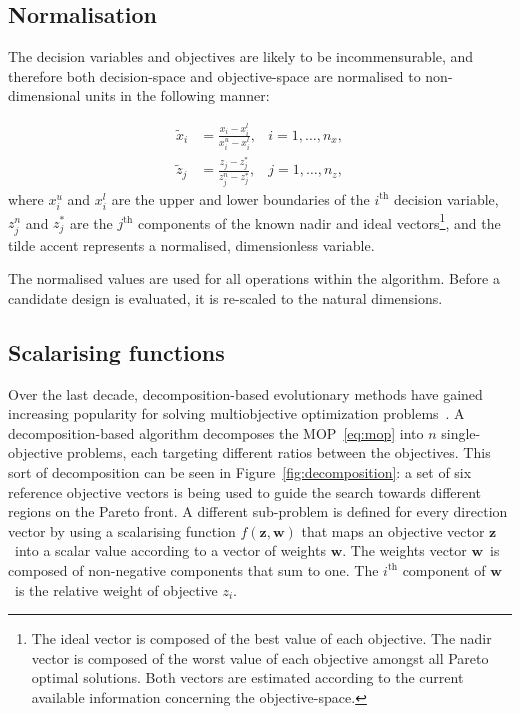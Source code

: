 \documentclass[a4paper]{article}
\newcommand{\brr}[1]{{\left({#1}\right)}} %
\newcommand{\vz}{\ensuremath{\mathbf{z}}} %
\newcommand{\vw}{\ensuremath{\mathbf{w}}} %
\begin{document}
\subsection{Normalisation} 
\label{subsec:Normalisation}
The decision variables and objectives are likely to be incommensurable, and therefore both decision-space and objective-space are normalised to non-dimensional units in the following manner:

\begin{align}
	\tilde{x}_i &= \frac{x_i - x^l_i}{x^u_i - x^l_i} , &i=1,\ldots,n_x,\\
	\tilde{z}_j &= \frac{z_j - z^*_j}{z^n_j - z^*_j} , &j=1,\ldots,n_z,
\end{align}
where $x^u_i$ and $x^l_i$ are the upper and lower boundaries of the $i^\text{th}$ decision variable, $z^n_j$ and $z^*_j$ are the $j^\text{th}$ components of the known nadir and ideal vectors\footnote{The ideal vector is composed of the best value of each objective. The nadir vector is composed of the worst value of each objective amongst all Pareto optimal solutions. Both vectors are estimated according to the current available information concerning the objective-space.}, and the tilde accent represents a normalised, dimensionless variable.

The normalised values are used for all operations within the algorithm. Before a candidate design is evaluated, it is re-scaled to the natural dimensions.

\subsection{Scalarising functions}
\label{subsec:Scalarising}
Over the last decade, decomposition-based evolutionary methods have gained increasing popularity for solving multiobjective optimization problems~\cite{Giagkiozis2013Overview}. A decomposition-based algorithm decomposes the MOP~\eqref{eq:mop} into $n$ single-objective problems, each targeting different ratios between the objectives. This sort of decomposition can be seen in Figure~\ref{fig:decomposition}: a set of six reference objective vectors is being used to guide the search towards different regions on the Pareto front. A different sub-problem is defined for every direction vector by using a scalarising function $f\brr{\vz,\vw}$ that maps an objective vector \vz\ into a scalar value according to a vector of weights \vw. The weights vector \vw\ is composed of non-negative components that sum to one.
The $i^\text{th}$ component of \vw\ is the relative weight of objective $z_i$.
\end{document}
